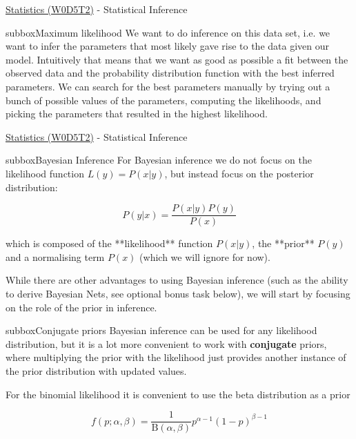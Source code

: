 \begin{textbox}{\href{https://compneuro.neuromatch.io/tutorials/W0D5_Statistics/student/W0D5_Tutorial2.html}{Statistics (W0D5T2)} - Statistical Inference}
\begin{subbox}{subbox}{Maximum likelihood}
We want to do inference on this data set, i.e. we want to infer the parameters that most likely gave rise to the data given our model. Intuitively that means that we want as good as possible a fit between the observed data and the probability distribution function with the best inferred parameters. We can search for the best parameters manually by trying out a bunch of possible values of the parameters, computing the likelihoods, and picking the parameters that resulted in the highest likelihood. 

\end{subbox}
\end{textbox}
\begin{textbox}{\href{https://compneuro.neuromatch.io/tutorials/W0D5_Statistics/student/W0D5_Tutorial2.html}{Statistics (W0D5T2)} - Statistical Inference}
\begin{subbox}{subbox}{Bayesian Inference}
\scriptsize
For Bayesian inference we do not focus on the likelihood function $L(y)=P(x|y)$, but instead focus on the posterior distribution: 

\begin{equation}
P(y|x)=\frac{P(x|y)P(y)}{P(x)}
\end{equation}

which is composed of the **likelihood** function $P(x|y)$, the **prior** $P(y)$ and a normalising term $P(x)$ (which we will ignore for now).

While there are other advantages to using Bayesian inference (such as the ability to derive Bayesian Nets, see optional bonus task below), we will start by focusing on the role of the prior in inference.

\end{subbox}
\begin{subbox}{subbox}{Conjugate priors}
\scriptsize
Bayesian inference can be used for any likelihood distribution, but it is a lot more convenient to work with \textbf{conjugate} priors, where multiplying the prior with the likelihood just provides another instance of the prior distribution with updated values. 

For the binomial likelihood it is convenient to use the beta distribution as a prior

\begin{equation}
f(p;\alpha ,\beta )={\frac {1}{\mathrm {B} (\alpha ,\beta )}}p^{\alpha -1}(1-p)^{\beta -1}
\end{equation}


\end{subbox}
\end{textbox}
